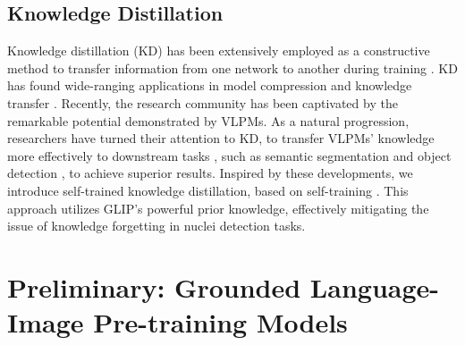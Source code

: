 \documentclass[journal,twoside,web]{ieeecolor}
\begin{document}
\subsection{Knowledge Distillation}\; Knowledge distillation (KD) has been extensively employed as a constructive method to transfer information from one network to another during training \cite{hinton2015distilling,wang2021knowledge}. KD has found wide-ranging applications in model compression \cite{buciluǎ2006model} and knowledge transfer \cite{ahn2019variational}. Recently, the research community has been captivated by the remarkable potential demonstrated by VLPMs. As a natural progression, researchers have turned their attention to KD, to transfer VLPMs' knowledge more effectively to downstream tasks \cite{zhang2023vision}, such as semantic segmentation \cite{ding2022decoupling,luddecke2022image} and object detection \cite{zhao2022exploiting,lin2022learning,wang2023object}, to achieve superior results. Inspired by these developments, we introduce self-trained knowledge distillation, based on self-training \cite{dopido2013semisupervised}. This approach utilizes GLIP's powerful prior knowledge, effectively mitigating the issue of knowledge forgetting in nuclei detection tasks.




\section{Preliminary: Grounded Language-Image Pre-training Models}


\end{document}
